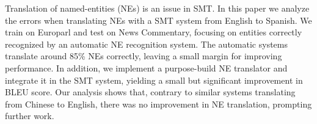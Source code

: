 Translation of named-entities (NEs) is an issue in SMT. In this paper we analyze the errors when translating NEs with a SMT system from English to Spanish. We train on Europarl and test on News Commentary, focusing on entities correctly recognized by an automatic NE recognition system. The automatic systems translate around 85\% NEs correctly, leaving a small margin for improving performance. In addition, we implement a purpose-build NE translator and integrate it in the SMT system, yielding a small but significant improvement in BLEU score. Our analysis shows that, contrary to similar systems translating from Chinese to English, there was no improvement in NE translation, prompting further work.
